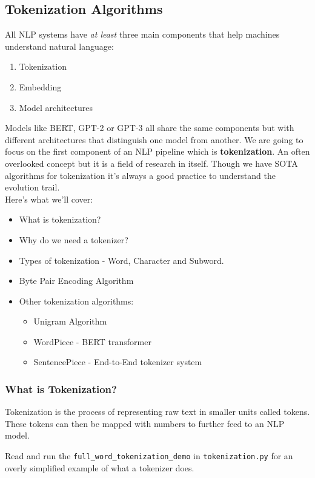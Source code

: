 \subsection{Tokenization Algorithms}
All NLP systems have \textit{at least} three main components that help machines understand natural language:
\begin{enumerate}
    \item Tokenization
    \item Embedding
    \item Model architectures
\end{enumerate}

Models like BERT, GPT-2 or GPT-3 all share the same components but with different architectures that distinguish one model from another.
We are going to focus on the first component of an NLP pipeline which is \textbf{tokenization}. An often overlooked concept but it is a field of research in itself. 
Though we have SOTA algorithms for tokenization it's always a good practice to understand the evolution trail. \\

\noindent Here's what we'll cover:
\begin{itemize}
    \item What is tokenization?
    \item Why do we need a tokenizer?
    \item Types of tokenization - Word, Character and Subword.
    \item Byte Pair Encoding Algorithm
    \item Other tokenization algorithms:
    \begin{itemize}
        \item Unigram Algorithm
        \item WordPiece - BERT transformer
        \item SentencePiece - End-to-End tokenizer system
    \end{itemize}
\end{itemize}

\subsubsection{What is Tokenization?}

Tokenization is the process of representing raw text in smaller units called tokens. These tokens can then be mapped with numbers to further feed to an NLP model.

\noindent Read and run the \texttt{full\_word\_tokenization\_demo} in \texttt{tokenization.py} for an overly simplified example of what a tokenizer does.

